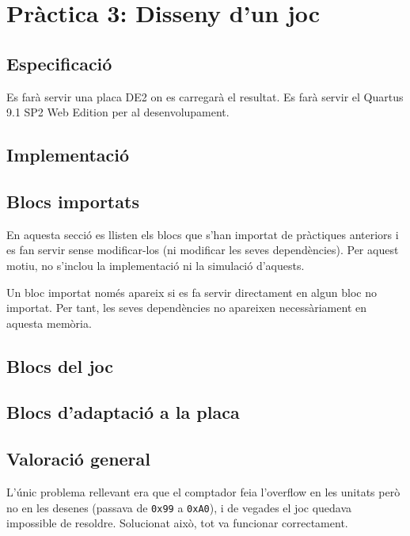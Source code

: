 \chapter{Pràctica 3: Disseny d'un joc}

\section{Especificació}


Es farà servir una placa DE2 on es carregarà el resultat. Es farà servir el Quartus 9.1 SP2 Web Edition per al desenvolupament.

\section{Implementació}


\section{Blocs importats}

En aquesta secció es llisten els blocs que s'han importat de pràctiques
anteriors i es fan servir sense modificar-los (ni modificar les seves
dependències). Per aquest motiu, no s'inclou la implementació ni la
simulació d'aquests.

Un bloc importat només apareix si es fa servir directament en algun bloc
no importat. Per tant, les seves dependències no apareixen necessàriament
en aquesta memòria.


\section{Blocs del joc}

\section{Blocs d'adaptació a la placa}

\section{Valoració general}

L'únic problema rellevant era que el comptador feia l'overflow en les unitats
però no en les desenes (passava de \texttt{0x99} a \texttt{0xA0}), i de vegades
el joc quedava impossible de resoldre. Solucionat això, tot va funcionar correctament.
